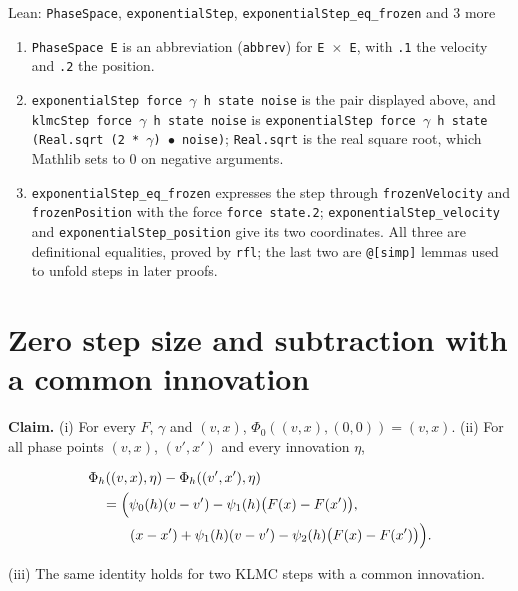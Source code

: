 \documentclass[11pt,a4paper]{article}
\begin{document}
\begin{leanbox}{Lean: \texttt{PhaseSpace}, \texttt{exponentialStep}, \texttt{exponentialStep\_\allowbreak{}eq\_\allowbreak{}frozen} and 3 more}
\begin{enumerate}
\item \texttt{Phase\allowbreak{}Space E} is an abbreviation (\texttt{abbrev}) for \texttt{E \ensuremath{\times} E}, with \texttt{.\allowbreak{}1} the velocity and \texttt{.\allowbreak{}2} the position.

\item \texttt{exponential\allowbreak{}Step force \ensuremath{\gamma} h state noise} is the pair displayed above, and \texttt{klmc\allowbreak{}Step force \ensuremath{\gamma} h state noise} is \texttt{exponential\allowbreak{}Step force \ensuremath{\gamma} h state (Real.\allowbreak{}sqrt (2 * \ensuremath{\gamma}) \ensuremath{\bullet} noise)}; \texttt{Real.\allowbreak{}sqrt} is the real square root, which Mathlib sets to \(0\) on negative arguments.

\item \texttt{exponential\allowbreak{}Step\_\allowbreak{}eq\_\allowbreak{}frozen} expresses the step through \texttt{frozen\allowbreak{}Velocity} and \texttt{frozen\allowbreak{}Position} with the force \texttt{force state.\allowbreak{}2}; \texttt{exponential\allowbreak{}Step\_\allowbreak{}velocity} and \texttt{exponential\allowbreak{}Step\_\allowbreak{}position} give its two coordinates. All three are definitional equalities, proved by \texttt{rfl}; the last two are \texttt{@[simp]} lemmas used to unfold steps in later proofs.

\end{enumerate}
\end{leanbox}

\section{\texorpdfstring{Zero step size and subtraction with a common innovation}{Zero step size and subtraction with a common innovation}}


\textbf{Claim.} (i) For every \(F\), \(\gamma\) and \((v,x)\), \(\Phi_0((v,x),(0,0))=(v,x)\).
(ii) For all phase points \((v,x)\), \((v',x')\) and every innovation \(\eta\),


\[\begin{aligned}
&\Phi_h((v,x),\eta)-\Phi_h((v',x'),\eta)\\
&\quad=\Bigl(\psi_0(h)(v-v')-\psi_1(h)\bigl(F(x)-F(x')\bigr),\\
&\qquad\quad(x-x')+\psi_1(h)(v-v')-\psi_2(h)\bigl(F(x)-F(x')\bigr)\Bigr).
\end{aligned}\]


(iii) The same identity holds for two KLMC steps with a common innovation.
\end{document}
